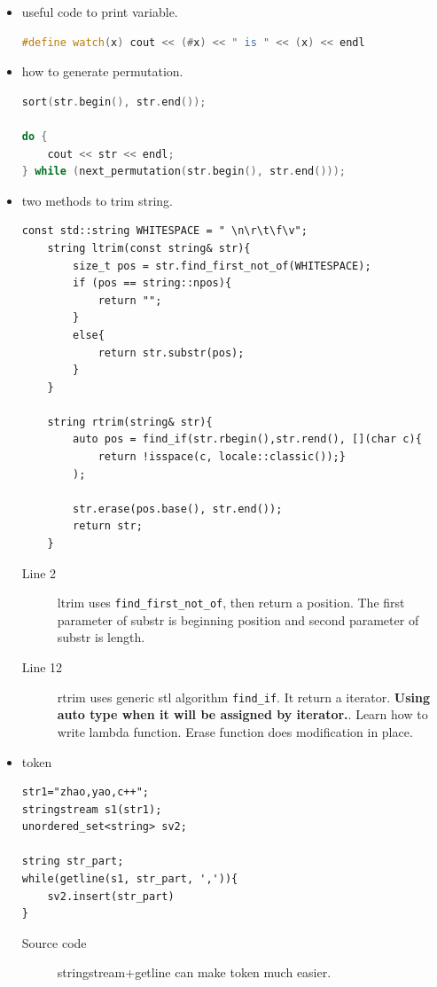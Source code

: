 \documentclass[a4paper,11pt,twoside]{book}
\begin{document}
\begin{itemize}
	\item useful code to print variable. 
\begin{lstlisting}[frame=single, language=c++]
	#define watch(x) cout << (#x) << " is " << (x) << endl
\end{lstlisting}
	
	\item  how to generate permutation. 
\begin{lstlisting}[frame=single, language=c++]
sort(str.begin(), str.end());

do {
	cout << str << endl;
} while (next_permutation(str.begin(), str.end()));	
\end{lstlisting}	

	\item two methods to trim string.

\begin{lstlisting}[numbers=none]
	const std::string WHITESPACE = " \n\r\t\f\v";
	string ltrim(const string& str){
		size_t pos = str.find_first_not_of(WHITESPACE);
		if (pos == string::npos){
			return "";
		}
		else{
			return str.substr(pos);
		}
	}
	
	string rtrim(string& str){
		auto pos = find_if(str.rbegin(),str.rend(), [](char c){ 
			return !isspace(c, locale::classic());}
		);
		
		str.erase(pos.base(), str.end());
		return str;
	}
\end{lstlisting}
\begin{description}
	\item[Line 2] ltrim uses \texttt{find\_first\_not\_of}, then return a position. The first parameter of substr is beginning position and second parameter of substr is length. 
	
	\item[Line 12] rtrim uses generic stl algorithm \texttt{find\_if}. It return a iterator. \textbf{Using auto type when it will be assigned by iterator.}. Learn how to write lambda function.  Erase function does modification in place. 
\end{description}

\item token
\begin{lstlisting}[numbers=none]
str1="zhao,yao,c++";
stringstream s1(str1);
unordered_set<string> sv2;

string str_part;
while(getline(s1, str_part, ',')){
	sv2.insert(str_part)
}	
\end{lstlisting}

\begin{description}
	\item[Source code] stringstream+getline can make token much easier.
\end{description}


\end{itemize}
\end{document}
